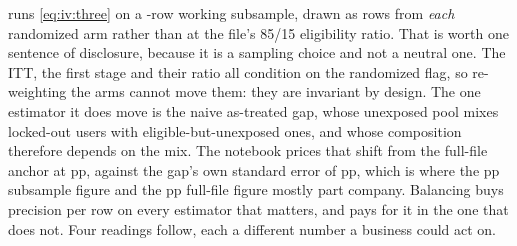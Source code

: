  runs \cref{eq:iv:three} on a \nbElevenBNSub-row working subsample, drawn as
\nbElevenBNArm{} rows from \emph{each} randomized arm rather than at the file's 85/15 eligibility
ratio. That is worth one sentence of disclosure, because it is a sampling choice and not a neutral
one. The ITT, the first stage and their ratio all condition on the randomized flag, so re-weighting
the arms cannot move them: they are invariant by design. The one estimator it does move is the naive
as-treated gap, whose unexposed pool mixes locked-out users with eligible-but-unexposed ones, and
whose composition therefore depends on the mix. The notebook prices that shift from the full-file
anchor at \nbElevenBNaiveBalShift{} pp, against the gap's own standard error of
\nbElevenBNaiveSe{} pp, which is where the \nbElevenBNaive{} pp subsample figure and the
\nbElevenBAnchorNaive{} pp full-file figure mostly part company. Balancing buys precision per row on
every estimator that matters, and pays for it in the one that does not. Four readings follow, each a
different number a business could act on.

